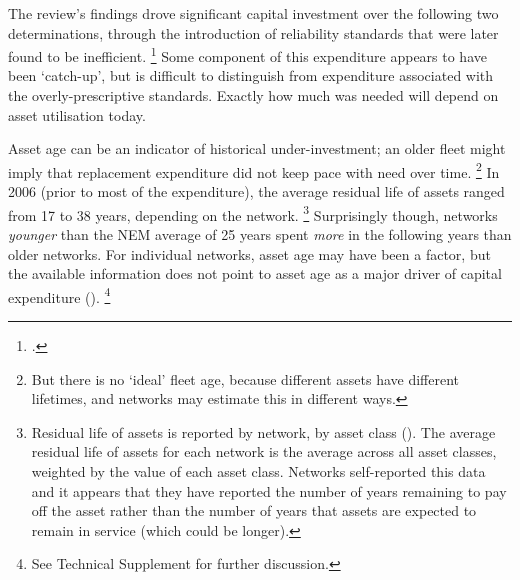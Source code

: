 \documentclass[FrontPage]{grattan}
\begin{document}
The review's findings drove significant capital investment over the following two determinations, through the introduction of reliability standards that were later found to be inefficient.%
\footcite{Bellas2014IRPonnetworkcosts}
Some component of this expenditure appears to have been `catch-up', but is difficult to distinguish from expenditure associated with the overly-prescriptive standards. Exactly how much was needed will depend on asset utilisation today.

Asset age can be an indicator of historical under-investment; an older fleet might imply that replacement expenditure did not keep pace with need over time.%
\footnote{But there is no `ideal' fleet age, because different assets have different lifetimes, and networks may estimate this in different ways.}
In 2006 (prior to most of the expenditure), the average residual life of assets ranged from 17 to 38 years, depending on the network.%
\footnote{Residual life of assets is reported by network, by asset class (\textcite{AER2018NetworkPerformanceRINResponses}). The average residual life of assets for each network is the average across all asset classes, weighted by the value of each asset class. Networks self-reported this data and it appears that they have reported the number of years remaining to pay off the asset rather than the number of years that assets are expected to remain in service (which could be longer).}
Surprisingly though, networks \emph{younger} than the NEM average of 25 years spent \emph{more} in the following years than older networks. For individual networks, asset age may have been a factor, but the available information does not point to asset age as a major driver of capital expenditure ().%
\footnote{See Technical Supplement for further discussion.}
\end{document}
